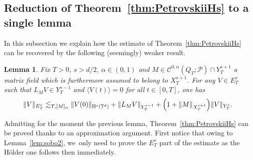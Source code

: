 \documentclass[JEP,XML,SOM,Unicode,published]{cedram}
\newtheorem{lem}[prop]{Lemma}
\theoremstyle{definition}
\newcommand\T{\mathbb{T}}
\renewcommand\H{\mathrm{H}}
\begin{document}
\subsection{Reduction of Theorem~\ref{thm:PetrovskiiHs} to a single lemma}\label{subsec:redlip}
In this subsection we explain how the estimate of Theorem~\ref{thm:PetrovskiiHs} can be recovered by the following (seemingly) weaker result.
\begin{lem}\label{lem:goalL2:weak}
Fix $T>0$, $s>d/2$, $\alpha\in(0,1)$ and $M\in\mathscr{C}^{0,\alpha}(Q_T;\mathscr{P})\cap Y_T^{s+1}$ a matrix field which is furthermore assumed to belong to $X_T^{s+1}$. For any $V\in E_T^s$ such that $L_M V\in Y_T^{s-1}$ and $\langle V(t)\rangle = 0$ for all $t\in[0,T]$, one has
\[
\|V\|_{E_T^s} \lesssim_{T,[M]_\alpha} \|V(0)\|_{\H^s(\T^d)} + \| L_M V \|_{Y_T^{s-1}} + \Bigl(1+\|M\|_{X^{s+1}_T}\Bigr)\|V\|_{Y_T^s}.
\]
\end{lem}
Admitting for the moment the previous lemma, Theorem~\ref{thm:PetrovskiiHs} can be proved thanks to an approximation argument. First notice that owing to Lemma~\ref{lem:sobo2}, we~only need to prove the $E_T^s$ part of the estimate as the Hölder one follows then immediately.
\end{document}
